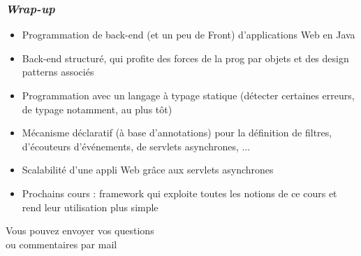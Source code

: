 \documentclass{beamer}
\begin{document}
\begin{frame}
	\frametitle{\textit{Wrap-up}}
	\begin{itemize}
		\item Programmation de back-end (et un peu de Front) d'applications Web en Java 
		\item Back-end structuré, qui profite des forces de la prog par objets et des design patterns associés
		\item Programmation avec un langage à typage statique (détecter certaines erreurs, de typage notamment, au plus tôt)
		\item Mécanisme déclaratif (à base d'annotations) pour la définition de filtres, d'écouteurs d'événements, de servlets asynchrones, ...
		\item Scalabilité d'une appli Web grâce aux servlets asynchrones
		\item Prochains cours : framework qui exploite toutes les notions de ce cours et rend leur utilisation plus simple
	\end{itemize}
\end{frame}

\begin{frame}
  \begin{center}
  
  	\vspace{5cm}
  	
  	Vous pouvez envoyer vos questions\\ ou commentaires par mail
  \end{center}
\end{frame}
\end{document}
